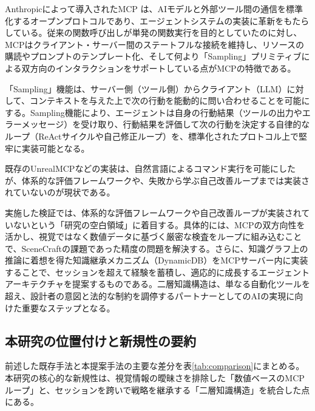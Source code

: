 \documentclass[dvipdfmx, a4paper, 9pt]{deimj}
\begin{document}
Anthropicによって導入されたMCP\cite{anthropic2024mcp} は、AIモデルと外部ツール間の通信を標準化するオープンプロトコルであり、エージェントシステムの実装に革新をもたらしている。従来の関数呼び出しが単発の関数実行を目的としていたのに対し\cite{schick2024toolformer}、MCPはクライアント・サーバー間のステートフルな接続を維持し、リソースの購読やプロンプトのテンプレート化、そして何より「Sampling」プリミティブによる双方向のインタラクションをサポートしている点がMCPの特徴である。

「Sampling」機能は、サーバー側（ツール側）からクライアント（LLM）に対して、コンテキストを与えた上で次の行動を能動的に問い合わせることを可能にする。Sampling機能により、エージェントは自身の行動結果（ツールの出力やエラーメッセージ）を受け取り、行動結果を評価して次の行動を決定する自律的なループ（ReActサイクル\cite{yao2023react}や自己修正ループ\cite{shinn2024reflexion,xi2023rise}）を、標準化されたプロトコル上で堅牢に実装可能となる。

既存のUnrealMCP\cite{unrealmcp2024}などの実装は、自然言語によるコマンド実行を可能にしたが、体系的な評価フレームワークや、失敗から学ぶ自己改善ループまでは実装されていないのが現状である。

実施した検証では、体系的な評価フレームワークや自己改善ループが実装されていないという「研究の空白領域」に着目する。具体的には、MCPの双方向性を活かし、視覚ではなく数値データに基づく厳密な検査をループに組み込むことで、SceneCraftの課題であった精度の問題を解決する。さらに、知識グラフ上の推論に着想を得た知識継承メカニズム（DynamicDB）をMCPサーバー内に実装することで、セッションを超えて経験を蓄積し、適応的に成長するエージェントアーキテクチャを提案するものである。二層知識構造は、単なる自動化ツールを超え、設計者の意図と法的な制約を調停するパートナーとしてのAIの実現に向けた重要なステップとなる。

\subsection{本研究の位置付けと新規性の要約}

前述した既存手法と本提案手法の主要な差分を表\ref{tab:comparison}にまとめる。本研究の核心的な新規性は、視覚情報の曖昧さを排除した「数値ベースのMCPループ」と、セッションを跨いで戦略を継承する「二層知識構造」を統合した点にある。
\end{document}
